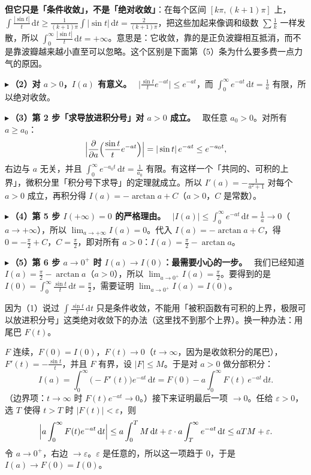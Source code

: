 \documentclass[UTF8,a4paper,11pt]{ctexart}
\renewcommand{\d}{\,\mathrm{d}}
\newcounter{ex}[section]
\newcommand{\point}[1]{\par\addvspace{1ex}\noindent\textcolor{ptteal}{$\blacktriangleright$\,\textbf{#1}}\ }
\renewcommand{\paragraph}[1]{\point{#1}}
\begin{document}
\textbf{但它只是「条件收敛」，不是「绝对收敛」}：在每个区间 $[k\pi,(k+1)\pi]$ 上，$\int\frac{|\sin t|}{t}\d t\ge\frac{1}{(k+1)\pi}\int|\sin t|\d t=\frac{2}{(k+1)\pi}$，把这些加起来像调和级数 $\sum\frac1k$ 一样发散，所以 $\int_0^\infty\frac{|\sin t|}{t}\d t=+\infty$。意思是：它收敛，靠的是正负波瓣相互抵消，而不是靠波瓣越来越小直至可以忽略。这个区别是下面第（5）条为什么要多费一点力气的原因。

\paragraph{（2）对 $a>0$，$I(a)$ 有意义。}
$\bigl|\frac{\sin t}{t}e^{-at}\bigr|\le e^{-at}$，而 $\int_0^\infty e^{-at}\d t=\frac1a$ 有限，所以绝对收敛。

\paragraph{（3）第 2 步「求导放进积分号」对 $a>0$ 成立。}
取任意 $a_0>0$。对所有 $a\ge a_0$：
\[
\Bigl|\frac{\partial}{\partial a}\Bigl(\frac{\sin t}{t}e^{-at}\Bigr)\Bigr|=|\sin t|\,e^{-at}\le e^{-a_0t},
\]
右边与 $a$ 无关，并且 $\int_0^\infty e^{-a_0t}\d t=\frac1{a_0}$ 有限。有这样一个「共同的、可积的上界」，微积分里「积分号下求导」的定理就成立。所以 $I'(a)=-\frac1{a^2+1}$ 对每个 $a>0$ 成立，再积分得 $I(a)=-\arctan a+C$（$a>0$，$C$ 是常数）。

\paragraph{（4）第 5 步 $I(+\infty)=0$ 的严格理由。}
$|I(a)|\le\int_0^\infty e^{-at}\d t=\frac1a\to0$（$a\to+\infty$），所以 $\lim_{a\to+\infty}I(a)=0$。代入 $I(a)=-\arctan a+C$，得 $0=-\frac\pi2+C$，$C=\frac\pi2$，即对所有 $a>0$：$I(a)=\frac\pi2-\arctan a$。

\paragraph{（5）第 6 步 $a\to0^{+}$ 时 $I(a)\to I(0)$：最需要小心的一步。}
我们已经知道 $I(a)=\frac\pi2-\arctan a$（$a>0$），所以 $\lim_{a\to0^+}I(a)=\frac\pi2$。要得到的是 $I(0)=\int_0^\infty\frac{\sin t}{t}\d t=\frac\pi2$，需要证明 $\lim_{a\to0^+}I(a)=I(0)$。

因为（1）说过 $\int\frac{\sin t}{t}\d t$ 只是条件收敛，不能用「被积函数有可积的上界，极限可以放进积分号」这类绝对收敛下的办法（这里找不到那个上界）。换一种办法：用尾巴 $F(t)$。

$F$ 连续，$F(0)=I(0)$，$F(t)\to0$（$t\to\infty$，因为是收敛积分的尾巴），$F'(t)=-\frac{\sin t}{t}$，并且 $F$ 有界，设 $|F|\le M$。于是对 $a>0$ 做分部积分：
\[
I(a)=\int_0^\infty\bigl(-F'(t)\bigr)e^{-at}\d t=F(0)-a\int_0^\infty F(t)\,e^{-at}\d t .
\]
（边界项：$t\to\infty$ 时 $F(t)e^{-at}\to0$。）接下来证明最后一项 $\to0$。任给 $\varepsilon>0$，选 $T$ 使得 $t>T$ 时 $|F(t)|<\varepsilon$，则
\[
\Bigl|a\int_0^\infty F(t)e^{-at}\d t\Bigr|
\le a\int_0^T M\d t+\varepsilon\cdot a\int_T^\infty e^{-at}\d t
\le aTM+\varepsilon .
\]
令 $a\to0^+$，右边 $\to\varepsilon$。$\varepsilon$ 是任意的，所以这一项趋于 $0$，于是 $I(a)\to F(0)=I(0)$。
\end{document}
